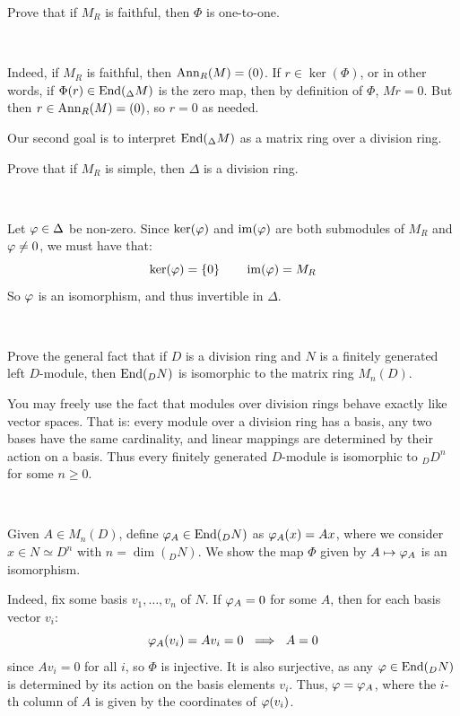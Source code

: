 \begin{exr}
	Prove that if $M_{R}$ is faithful, then $\Phi$ is one-to-one. 
\end{exr} \

\begin{pf}
	Indeed, if $M_{R}$ is faithful, then $\operatorname{Ann}_{R}(M)=(0)$.
	If $r\in\ker(\Phi)$, or in other words, if $\Phi(r)\in\operatorname{End}(_{\Delta}M)$ is the zero map,
	then by definition of $\Phi$, $Mr=0$.
	But then $r\in\operatorname{Ann}_{R}(M)=(0)$, so $r=0$ as needed.
\end{pf}

\newpage
\begin{exr}[title=Schur's Lemma]
	Our second goal is to interpret $\operatorname{End}({_\Delta}M)$ as a matrix ring over
	a division ring.

	Prove that if $M_{R}$ is simple, then $\Delta$ is a division ring.
\end{exr} \

\begin{pf}
	Let $\varphi\in\Delta$ be non-zero.
	Since $\ker(\varphi)$ and $\operatorname{im}(\varphi)$ are both submodules of $M_{R}$ and $\varphi\neq0$,
	we must have that:
	\begin{equation*}
		\ker(\varphi) = \left\{{0}\right\} \qquad \operatorname{im}(\varphi)=M_{R}
	\end{equation*}
	So $\varphi$ is an isomorphism, and thus invertible in $\Delta$.
\end{pf} \

\begin{exr}
	Prove the general fact that if $D$ is a division ring and $N$ is a
	finitely generated left $D$-module, then $\operatorname{End}({_D}N)$ is isomorphic to
	the matrix ring $M_n(D)$.

	You may freely use the fact that modules over division rings behave
	exactly like vector spaces.
	That is: every module over a division ring has a basis, any two bases
	have the same cardinality, and linear mappings are determined by their
	action on a basis. Thus every finitely generated $D$-module is
	isomorphic to ${_D}D^n$ for some $n\geq 0$.
\end{exr} \

\begin{pf}
	Given $A\in M_{n}(D)$, define $\varphi_{A}\in\operatorname{End}(_{D}N)$ as $\varphi_{A}(x)=Ax$,
	where we consider $x\in N\simeq D^{n}$ with $n=\dim(_{D}N)$.
	We show the map $\Phi$ given by $A\mapsto\varphi_{A}$ is an isomorphism.

	Indeed, fix some basis $v_{1},\dots,v_{n}$ of $N$.
	If $\varphi_{A}=0$ for some $A$, then for each basis vector $v_{i}$:
	\begin{equation*}
		\vphi_{A}(v_{i}) = Av_{i} = 0 \ \implies \ A = 0
	\end{equation*}
	since $Av_{i}=0$ for all $i$, so $\Phi$ is injective.
	It is also surjective, as any $\varphi\in\operatorname{End}(_{D}N)$ is determined by
	its action on the basis elements $v_{i}$.
	Thus, $\varphi=\varphi_{A}$, where the $i$-th column of $A$ is given by the
	coordinates of $\varphi(v_{i})$.
\end{pf} \

